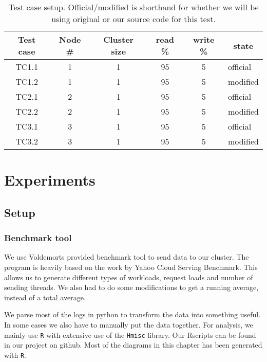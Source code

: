 \begin{center}
\begin{table}[h]
	\begin{tabular}{|c|c|c|c|c|l|}
		\multicolumn{1}{c}{Test case} & 
		\multicolumn{1}{c}{Node \#} &
		\multicolumn{1}{c}{Cluster size} &  
		\multicolumn{1}{c}{read \%} & 
		\multicolumn{1}{c}{write \%} & 
		\multicolumn{1}{c}{state} \\
		\hline

		TC1.1 & 1 & 1 & 95 & 5 & official \\
		TC1.2 & 1 & 1 & 95 & 5 & modified \\
		\hline
		TC2.1 & 2 & 1 & 95 & 5 & official \\
		TC2.2 & 2 & 1 & 95 & 5 & modified \\
		\hline
		TC3.1 & 3 & 1 & 95 & 5 & official \\
		TC3.2 & 3 & 1 & 95 & 5 & modified \\

		\hline
	\end{tabular}
	\caption{Test case setup. Official/modified is shorthand for whether we will be using original or our source code for this test.}
	\label{tbl:testcases}
\end{table}
\end{center}

\section{Experiments}
\subsection{Setup}
\subsubsection{Benchmark tool}
We use Voldemorts provided benchmark tool to send data to our cluster. The program is heavily based on the work by Yahoo Cloud Serving Benchmark. This allows us to generate different types of workloads, request loads and number of sending threads. We also had to do some modifications to get a running average, instead of a total average.

We parse most of the logs in python to transform the data into something useful. In some cases we also have to manually put the data together.
For analysis, we mainly use \texttt{R}\cite{Rproject} with extensive use of the \texttt{Hmisc}\cite{Hmisc} library. Our Rscripts can be found in our project on github\cite{githubproject}. Most of the diagrams in this chapter has been generated with \texttt{R}.

